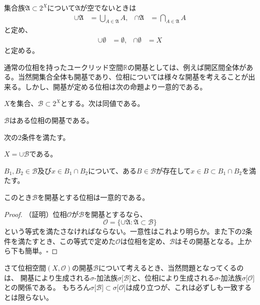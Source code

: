 \documentclass[../root.tex]{subfiles}
\begin{document}
\begin{Rem}{}{}
集合族$ \mathfrak{A}\subset 2^{X} $について$ \mathfrak{A} $が空でないときは
\begin{align*}
\cup\mathfrak{A}&=\bigcup_{A\in\mathfrak{A}}A,& \cap\mathfrak{A}&=\bigcap_{A\in\mathfrak{A}}A
\end{align*}
と定め、
\begin{align*}
\cup\emptyset&=\emptyset, & \cap\emptyset&=X
\end{align*}
と定める。
\end{Rem}

通常の位相を持ったユークリッド空間$ \mathbb{R} $の開基としては、例えば開区間全体がある。当然開集合全体も開基であり、位相については様々な開基を考えることが出来る。しかし、開基が定める位相は次の命題より一意的である。

\begin{Prop}{}{}
$ X $を集合、$ \mathcal{B}\subset 2^{X} $とする。次は同値である。
\begin{EnumEquiv}
\item $ \mathcal{B} $はある位相の開基である。
\item 次の2条件を満たす。
	\begin{EnumCond}
 	\item $ X=\cup\mathcal{B} $である。
	\item $ B_{1}, B_{2}\in\mathcal{B} $及び$ x\in B_{1}\cap B_{2} $について、ある$ B\in\mathcal{B} $が存在して$ x\in B\subset B_{1}\cap B_{2} $を満たす。
	\end{EnumCond}
\end{EnumEquiv}

このとき$ \mathcal{B} $を開基とする位相は一意的である。
\end{Prop}

\begin{proof}
（証明）位相$ \mathcal{O} $が$ \mathcal{B} $を開基とするなら、
\[ \mathcal{O}=\lbrace \cup\mathfrak{A} : \mathfrak{A}\subset\mathcal{B} \rbrace \]
という等式を満たさなければならない。一意性はこれより明らか。また下の2条件を満たすとき、この等式で定めた$ \mathcal{O} $は位相を定め、$ \mathcal{B} $はその開基となる。上から下も簡単。$ \square $
\end{proof}

さて位相空間$ ( X, \mathcal{O} ) $の開基$ \mathcal{B} $について考えるとき、当然問題となってくるのは、
開基により生成される$ \sigma $-加法族$ \sigma\lbrack \mathcal{B} \rbrack $と、位相により生成される$ \sigma $-加法族$ \sigma\lbrack \mathcal{O} \rbrack $との関係である。
もちろん$ \sigma\lbrack \mathcal{B} \rbrack\subset\sigma\lbrack \mathcal{O} \rbrack $は成り立つが、これは必ずしも一致するとは限らない。
\end{document}
